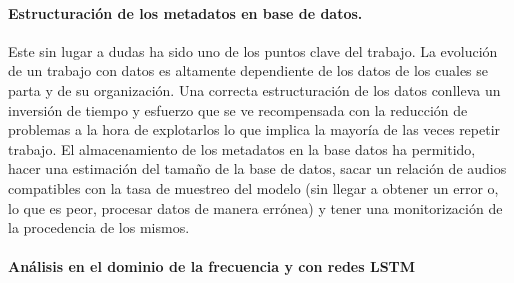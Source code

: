 \paragraph{Estructuración de los metadatos en base de datos.} Este sin lugar a dudas ha sido uno de los puntos clave del trabajo. La evolución de un trabajo con datos es altamente dependiente de los datos de los cuales se parta y de su organización. Una correcta estructuración de los datos conlleva un inversión de tiempo y esfuerzo que se ve recompensada con la reducción de problemas a la hora de explotarlos lo que implica la mayoría de las veces repetir trabajo. El almacenamiento de los metadatos en la base datos ha permitido, hacer una estimación del tamaño de la base de datos, sacar un relación de audios compatibles con la tasa de muestreo del modelo (sin llegar a obtener un error o, lo que es peor, procesar datos de manera errónea) y tener una monitorización de la procedencia de los mismos.

\paragraph{Análisis en el dominio de la frecuencia y con redes \gls{LSTM}}